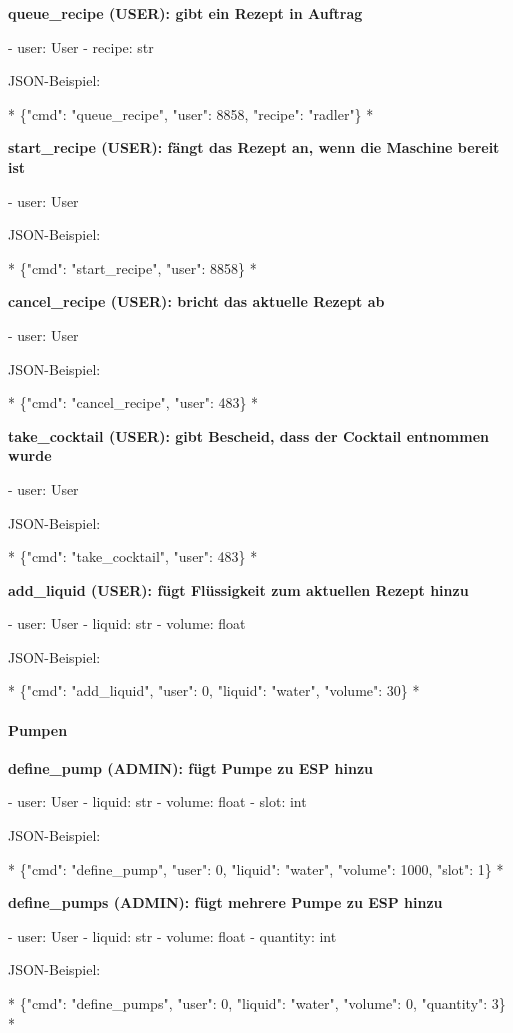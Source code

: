 \textbf{ queue\_recipe (USER): gibt ein Rezept in Auftrag}

- user: User
- recipe: str

JSON-Beispiel:

*
\{"cmd": "queue\_recipe", "user": 8858, "recipe": "radler"\}
*

\textbf{ start\_recipe (USER): fängt das Rezept an, wenn die Maschine bereit ist}

- user: User

JSON-Beispiel:

*
\{"cmd": "start\_recipe", "user": 8858\}
*

\textbf{ cancel\_recipe (USER): bricht das aktuelle Rezept ab}

- user: User

JSON-Beispiel:

*
\{"cmd": "cancel\_recipe", "user": 483\}
*

\textbf{ take\_cocktail (USER): gibt Bescheid, dass der Cocktail entnommen wurde}

- user: User

JSON-Beispiel:

*
\{"cmd": "take\_cocktail", "user": 483\}
*

\textbf{ add\_liquid (USER): fügt Flüssigkeit zum aktuellen Rezept hinzu}

- user: User
- liquid: str
- volume: float

JSON-Beispiel:

*
\{"cmd": "add\_liquid", "user": 0, "liquid": "water", "volume": 30\}
*

\paragraph{ Pumpen}

\textbf{ define\_pump (ADMIN): fügt Pumpe zu ESP hinzu}

- user: User
- liquid: str
- volume: float
- slot: int

JSON-Beispiel:

*
\{"cmd": "define\_pump", "user": 0, "liquid": "water", "volume": 1000, "slot": 1\}
*

\textbf{ define\_pumps (ADMIN): fügt mehrere Pumpe zu ESP hinzu}

- user: User
- liquid: str
- volume: float
- quantity: int

JSON-Beispiel:

*
\{"cmd": "define\_pumps", "user": 0, "liquid": "water", "volume": 0, "quantity": 3\}
*

